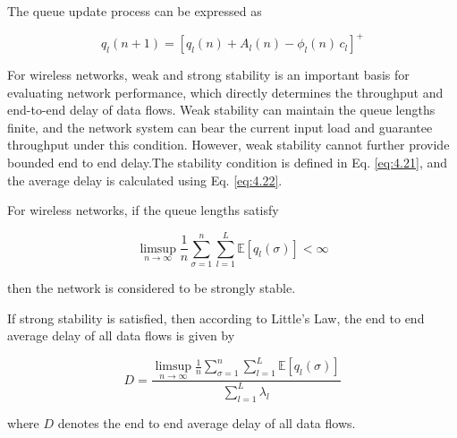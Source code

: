 \documentclass[a4paper,fleqn]{cas-dc}
\numberwithin{equation}{section}
\begin{document}
The queue update process can be expressed as



\begin{equation}
q_l(n+1) = \left[ q_l(n) + A_l(n) - \phi_l(n)\, c_l \right]^+
\end{equation}




For wireless networks, weak and strong stability is an important basis for evaluating network performance, which directly determines the throughput and end-to-end delay of data flows. Weak stability can maintain the queue lengths finite, and the network system can bear the current input load and guarantee throughput under this condition. However, weak stability cannot further provide bounded end to end delay.The stability condition is defined in Eq. \ref{eq:4.21}, and the average delay is calculated using Eq. \ref{eq:4.22}. 


For wireless networks, if the queue lengths satisfy

\begin{equation}
\limsup_{n \to \infty} \frac{1}{n} \sum_{\sigma=1}^{n} \sum_{l=1}^{L} \mathbb{E}[q_l(\sigma)] < \infty
\end{equation}

then the network is considered to be strongly stable. 



If strong stability is satisfied, then according to Little’s Law, the end to end average delay of all data flows is given by

\begin{equation}
D = \frac{\limsup_{n \to \infty} \frac{1}{n} \sum_{\sigma=1}^{n} \sum_{l=1}^{L} \mathbb{E}[q_l(\sigma)]}{\sum_{l=1}^{L} \lambda_l}
\end{equation}

where $D$ denotes the end to end average delay of all data flows.   
\end{document}
